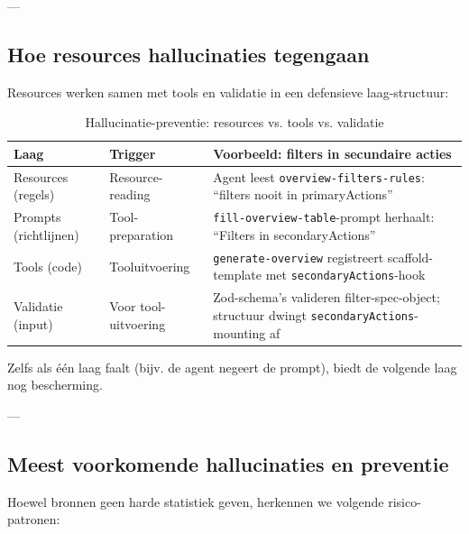 ---

\subsection{Hoe resources hallucinaties tegengaan}

Resources werken samen met tools en validatie in een defensieve laag-structuur:

\begin{table}[htbp]
  \centering
  \caption{Hallucinatie-preventie: resources vs. tools vs. validatie}
  \label{tab:resource-tool-defense}
  \small
  \begin{tabularx}{\textwidth}{|l|l|X|}
    \hline
    \textbf{Laag} & \textbf{Trigger} & \textbf{Voorbeeld: filters in secundaire acties} \\
    \hline
    Resources (regels) &
    Resource-reading & Agent leest \texttt{overview-filters-rules}: ``filters nooit in primaryActions'' \\
    \hline
    Prompts (richtlijnen) &
    Tool-preparation & \texttt{fill-overview-table}-prompt herhaalt: ``Filters in secondaryActions'' \\
    \hline
    Tools (code) &
    Tooluitvoering & \texttt{generate-overview} registreert scaffold-template met \texttt{secondaryActions}-hook \\
    \hline
    Validatie (input) &
    Voor tool-uitvoering & Zod-schema's valideren filter-spec-object; structuur dwingt \texttt{secondaryActions}-mounting af \\
    \hline
  \end{tabularx}
\end{table}

Zelfs als één laag faalt (bijv. de agent negeert de prompt), biedt de volgende laag nog bescherming.

---

\subsection{Meest voorkomende hallucinaties en preventie}

Hoewel bronnen geen harde statistiek geven, herkennen we volgende risico-patronen:

